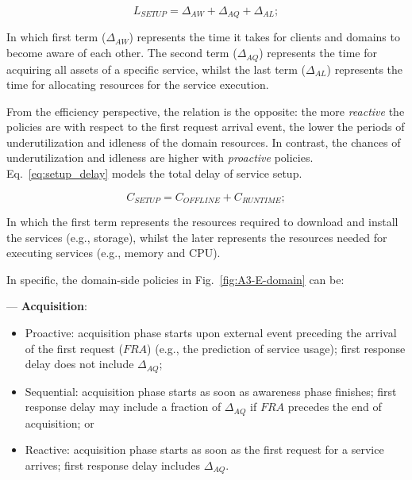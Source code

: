 \begin{equation}\label{eq:setup_delay}
L_{SETUP} = \Delta_{AW} + \Delta_{AQ} + \Delta_{AL};
\end{equation}


\noindent
In which first term ($\Delta_{AW}$) represents the time it takes for clients and domains to become aware of each other. The second term ($\Delta_{AQ}$) represents the time for acquiring all assets of a specific service, whilst the last term ($\Delta_{AL}$) represents the time for allocating resources for the service execution. 

From the efficiency perspective, the relation is the opposite: the more \textit{reactive} the policies are with respect to the first request arrival event, the lower the periods of underutilization and idleness of the domain resources. In contrast, the chances of underutilization and idleness are higher with \textit{proactive} policies. Eq.~\ref{eq:setup_delay} models the total delay of service setup. 

\begin{equation}\label{eq:setup_cost}
C_{SETUP} = C_{OFFLINE} + C_{RUNTIME};
\end{equation}

\noindent
In which the first term represents the resources required to download and install the services (e.g., storage), whilst the later represents the resources needed for executing services (e.g., memory and CPU).

In specific, the domain-side policies in Fig.~\ref{fig:A3-E-domain} can be:
\medskip
\medskip


--- \textbf{Acquisition}:

\begin{itemize}

\item Proactive: acquisition phase starts upon external event preceding the arrival of the first request ($FRA$) (e.g., the prediction of service usage); first response delay does not include $\Delta_{AQ}$;

\item Sequential: acquisition phase starts as soon as awareness phase finishes; first response delay may include a fraction of $\Delta_{AQ}$ if $FRA$ precedes the end of acquisition; or

\item Reactive: acquisition phase starts as soon as the first request for a service arrives; first response delay includes $\Delta_{AQ}$.

\end{itemize}

